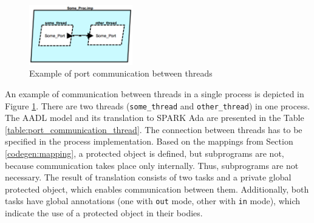 \begin{figure}
    \begin{center}
    	\includegraphics[width=0.4\textwidth]{figures/port-communication-thread.png}
    \end{center}
    \caption{Example of port communication between threads}
    \label{figure:port_communication_thread}
\end{figure}

An example of communication between threads in a single process is depicted in Figure \ref{figure:port_communication_thread}. There are two threads (\lstinline{some_thread} and \lstinline{other_thread}) in one process. The AADL model and its translation to SPARK Ada are presented in the Table \ref{table:port_communication_thread}. The connection between threads has to be specified in the process implementation. Based on the mappings from Section \ref{codegen:mapping}, a protected object is defined, but subprograms are not, because communication takes place only internally. Thus, subprograms are not necessary. The result of translation consists of two tasks and a private global protected object, which enables communication between them. Additionally, both tasks have global annotations (one with \lstinline{out} mode, other with \lstinline{in} mode), which indicate the use of a protected object in their bodies.

